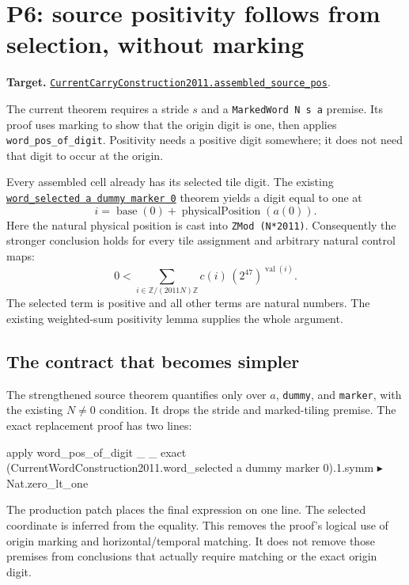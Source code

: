 \documentclass[11pt]{article}
\newcommand{\code}[1]{\nolinkurl{#1}}
\newcommand{\repo}[2]{\href{https://github.com/VladimirReshetnikov/ProveIt/blob/7df43cdfacb490cd3ca3acd23e39027efebf8801/Computability/DiophantineConsistency/#1}{#2}}
\begin{document}
\section{P6: source positivity follows from selection, without marking}
\label{sec:positive}

\textbf{Target.} \repo{Lean/DiophantineConsistency/CurrentCarryConstruction2011.lean}{\code{CurrentCarryConstruction2011.assembled_source_pos}}.

The current theorem requires a stride $s$ and a \code{MarkedWord N s a} premise. Its proof uses marking to show that the origin digit is one, then applies \code{word_pos_of_digit}. Positivity needs a positive digit somewhere; it does not need that digit to occur at the origin.

Every assembled cell already has its selected tile digit. The existing \repo{Lean/DiophantineConsistency/CurrentWordConstruction2011.lean}{\code{word_selected a dummy marker 0}} theorem yields a digit equal to one at
\[
 i=\operatorname{base}(0)+\operatorname{physicalPosition}(a(0)).
\]
Here the natural physical position is cast into \code{ZMod (N*2011)}. Consequently the stronger conclusion holds for every tile assignment and arbitrary natural control maps:
\[
 0<\sum_{i\in\mathbb Z/(2011N)\mathbb Z}
       c(i)\,(2^{47})^{\operatorname{val}(i)}.
\]
The selected term is positive and all other terms are natural numbers. The existing weighted-sum positivity lemma supplies the whole argument.

\subsection*{The contract that becomes simpler}

The strengthened source theorem quantifies only over $a$, \code{dummy}, and \code{marker}, with the existing $N\ne0$ condition. It drops the stride and marked-tiling premise. The exact replacement proof has two lines:

\begin{Lean}
  apply word_pos_of_digit _ _
  exact (CurrentWordConstruction2011.word_selected
    a dummy marker 0).1.symm ▸ Nat.zero_lt_one
\end{Lean}

The production patch places the final expression on one line. The selected coordinate is inferred from the equality. This removes the proof's logical use of origin marking and horizontal/temporal matching. It does not remove those premises from conclusions that actually require matching or the exact origin digit.
\end{document}

